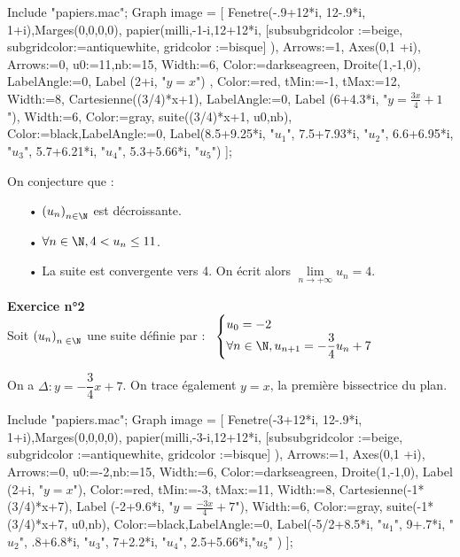 \begin{texgraph}[file,name=suite_02,export=tkz]
Include "papiers.mac";
Graph image = [
Fenetre(-.9+12*i, 12-.9*i, 1+i),Marges(0,0,0,0),
papier(milli,-1-i,12+12*i,
[subsubgridcolor :=beige,
subgridcolor:=antiquewhite,
gridcolor :=bisque]
),
  Arrows:=1,
Axes(0,1 +i),
  Arrows:=0,
  u0:=11,nb:=15, Width:=6,
Color:=darkseagreen, Droite(1,-1,0), 
LabelAngle:=0, Label (2+i, "$y=x$") ,
Color:=red,  tMin:=-1, tMax:=12, Width:=8, 
              Cartesienne((3/4)*x+1),
LabelAngle:=0, Label (6+4.3*i, "$y=\frac{3x}{4}+1$"),              
 Width:=6, Color:=gray,
  suite((3/4)*x+1, u0,nb),
Color:=black,LabelAngle:=0, 
Label(8.5+9.25*i, "$u_1$", 
      7.5+7.93*i, "$u_2$",  
      6.6+6.95*i, "$u_3$",   
      5.7+6.21*i, "$u_4$",   
      5.3+5.66*i, "$u_5$")   
];
\end{texgraph}

\vspace*{.5cm}

On conjecture que :

\begin{itemize}
\item[•] $\left(u_n\right)_{n \in \N}$ est décroissante.
\item[•] $\forall n \in \N, 4 < u_n \leq 11$.
\item[•] La suite est convergente vers 4. On écrit alors $\lim\limits_{n \to +\infty} u_n = 4$. 
\end{itemize}

\vspace*{.3cm}

\newpage

\textbf{Exercice n°2} \\

Soit $\left(u_n\right)_{n \; \in \N}$ une suite définie par :$ \; \; \; \begin{cases}
u_0 = -2 \\
\forall n \in \N, u_{n+1} = -\dfrac{3}{4}u_n + 7 \\
\end{cases}$ 

\vspace*{.3cm}

On a $\Delta : y = -\dfrac{3}{4}x + 7$. On trace également $y = x$, la première bissectrice du plan. \\

\begin{texgraph}[file,name=Suite03,export=pgf]
Include "papiers.mac";
Graph image = [
Fenetre(-3+12*i, 12-.9*i, 1+i),Marges(0,0,0,0),
papier(milli,-3-i,12+12*i,
          [subsubgridcolor :=beige,
              subgridcolor :=antiquewhite,
                 gridcolor :=bisque]
      ),
  Arrows:=1,
  Axes(0,1 +i),
  Arrows:=0,
  u0:=-2,nb:=15, Width:=6,
Color:=darkseagreen, Droite(1,-1,0), 
 Label (2+i, "$y=x$"),
Color:=red,  tMin:=-3, tMax:=11, Width:=8, 
              Cartesienne(-1*(3/4)*x+7),
 Label (-2+9.6*i, "$y=\frac{-3x}{4}+7$"),              
 Width:=6, Color:=gray,
             suite(-1*(3/4)*x+7, u0,nb),
Color:=black,LabelAngle:=0, 
Label(-5/2+8.5*i, "$u_1$", 
        9+.7*i,   "$u_2$",  
        .8+6.8*i, "$u_3$",   
         7+2.2*i, "$u_4$",   
       2.5+5.66*i,"$u_5$"
)   
];
\end{texgraph}

